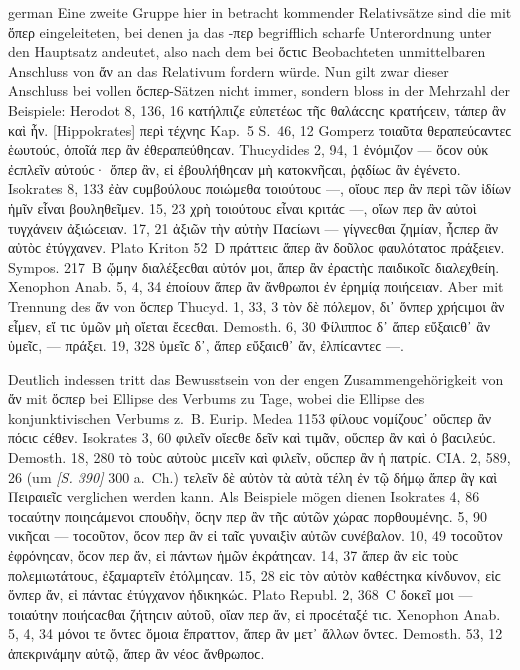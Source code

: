 \begin{otherlanguage*}{german}
Eine zweite Gruppe hier in betracht kommender Relativsätze sind die mit ὅπερ eingeleiteten, bei denen ja das -περ begrifflich scharfe Unterordnung unter den Hauptsatz andeutet, also nach dem bei ὅϲτιϲ Beobachteten unmittelbaren Anschluss von ἄν an das Relativum fordern würde. Nun gilt zwar dieser Anschluss bei vollen ὅϲπερ-Sätzen nicht immer, sondern bloss in der Mehrzahl der Beispiele: Herodot 8, 136, 16 κατήλπιζε εὐπετέωϲ τῆϲ θαλάϲϲηϲ κρατήϲειν, τάπερ ἂν καὶ ἦν. [Hippokrates] περὶ τέχνηϲ Kap.~5 S.~46, 12 Gomperz τοιαῦτα θεραπεύϲαντεϲ ἑωυτούϲ, ὁποῖά περ ἂν ἐθεραπεύθηϲαν. Thucydides 2, 94, 1 ἐνόμιζον — ὅϲον οὐκ ἐϲπλεῖν αὐτούϲ· ὅπερ ἂν, εἰ ἐβουλήθηϲαν μὴ κατοκνῆϲαι, ῥᾳδίωϲ ἂν ἐγένετο. Isokrates 8, 133 ἐὰν ϲυμβούλουϲ ποιώμεθα τοιούτουϲ —, οἵουϲ περ ἂν περὶ τῶν ἰδίων ἡμῖν εἶναι βουληθεῖμεν. 15, 23 χρὴ τοιούτουϲ εἶναι κριτάϲ —, οἵων περ ἂν αὐτοὶ τυγχάνειν ἀξιώϲειαν. 17, 21 ἀξιῶν τὴν αὐτὴν Παϲίωνι — γίγνεϲθαι ζημίαν, ἧϲπερ ἂν αὐτὸϲ ἐτύγχανεν. Plato Kriton 52~D πράττειϲ ἅπερ ἂν δοῦλοϲ φαυλότατοϲ πράξειεν. Sympos. 217~Β ᾤμην διαλέξεϲθαι αὐτόν μοι, ἅπερ ἂν ἐραϲτὴϲ παιδικοῖϲ διαλεχθείη. Xenophon Anab. 5, 4, 34 ἐποίουν ἅπερ ἂν ἄνθρωποι ἐν ἐρημίᾳ ποιή\-ϲειαν. Aber mit Trennung des ἄν von ὅϲπερ Thucyd. 1, 33, 3 τὸν δὲ πόλεμον, δι᾽ ὅνπερ χρήϲιμοι ἂν εἶμεν, εἴ τιϲ ὑμῶν μὴ οἴεται ἔϲεϲθαι. Demosth. 6, 30 Φίλιπποϲ δ᾽ ἅπερ εὔξαιϲθ᾽ ἂν ὑμεῖϲ, — πράξει. 19, 328 ὑμεῖϲ δ᾽, ἅπερ εὔξαιϲθ᾽ ἄν, ἐλπίϲαντεϲ —.

Deutlich indessen tritt das Bewusstsein von der engen Zusammengehörigkeit von ἄν mit ὅϲπερ bei Ellipse des Verbums zu Tage, wobei die Ellipse des konjunktivischen Verbums z.~B. Eurip. Medea 1153 φίλουϲ νομίζουϲ᾽ οὕϲπερ ἂν πόϲιϲ ϲέθεν. Isokrates 3, 60 φιλεῖν οἴεϲθε δεῖν καὶ τιμᾶν, οὕϲπερ ἂν καὶ ὁ βαϲιλεύϲ. Demosth. 18, 280 τὸ τοὺϲ αὐτοὺϲ μιϲεῖν καὶ φιλεῖν, οὕϲπερ ἂν ἡ πατρίϲ. CIA. 2, 589, 26 (um \hypertarget{p390}{\emph{[S. 390]}}\label{p390} 300 a.~Ch.) τελεῖν δὲ αὐτὸν τὰ αὐτὰ τέλη ἐν τῷ δήμῳ ἅπερ ἂγ καὶ Πειραιεῖϲ verglichen werden kann. Als Beispiele mögen dienen Isokrates 4, 86 τοϲαύτην ποιηϲάμενοι ϲπουδὴν, ὅϲην περ ἂν τῆϲ αὑτῶν χώραϲ πορθουμένηϲ. 5, 90 νικῆϲαι — τοϲοῦτον, ὅϲον περ ἂν εἰ ταῖϲ γυναιξὶν αὐτῶν ϲυνέβαλον. 10, 49 τοϲοῦτον ἐφρόνηϲαν, ὅϲον περ ἄν, εἰ πάντων ἡμῶν ἐκράτηϲαν. 14, 37 ἅπερ ἂν εἰϲ τοὺϲ πολεμιωτάτουϲ, ἐξαμαρτεῖν ἐτόλμηϲαν. 15, 28 εἰϲ τὸν αὐτὸν καθέϲτηκα κίνδυνον, εἰϲ ὅνπερ ἄν, εἰ πάνταϲ ἐτύγχανον ἠδικηκώϲ. Plato Republ. 2, 368~C δοκεῖ μοι — τοιαύτην ποιήϲαϲθαι ζήτηϲιν αὐτοῦ, οἵαν περ ἄν, εἰ προϲέταξέ τιϲ. Xenophon Anab. 5, 4, 34 μόνοι τε ὄντεϲ ὅμοια ἔπραττον, ἅπερ ἂν μετ᾽ ἄλλων ὄντεϲ. Demosth. 53, 12 ἀπεκρινάμην αὐτῷ, ἅπερ ἂν νέοϲ ἄνθρωποϲ.


\end{otherlanguage*}
